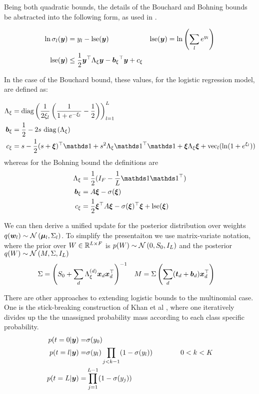 Being both quadratic bounds, the details of the Bouchard and Bohning bounds be abstracted into the following form, as used in \cite{Khan2010}.

\begin{align}
\ln \sigma_l(\bm y) & = y_l - \text{lse} (\bm y) & \text{lse} (\bm y) & = \ln \left(\sum_l e^{y_l} \right)\\
\text{lse}(\bm y) & \leq \frac{1}{2} \bm y^\top { \Lambda_{\xi} } \bm y - { \bm b_{\xi} }^\top\bm y + { c_{\xi} }
\end{align}

In the case of the Bouchard bound, these values, for the logistic regression model, are defined as:

\begin{align}
\Axi & = \diag{\frac{1}{2\xi_l} \left( \frac{1}{1 + e^{-\xi_l}} - \half\right) }_{l=1}^L  \\
\bxi & = \half - 2 s \text{ }\diag{\Axi} \\
\cxi & = s - \half (s + \vv{\xi})\T\one + s^2\Axi \one\T\one + \vv{\xi}\Axi\vv{\xi} + \text{vec}_l(\ln (1 + e^{\xi_l}))
\end{align}
whereas for the Bohning bound the definitions are
\begin{align}
\Axi & = \half (I_F - \frac{1}{L} \one \one \T) \\
\bxi & = A \vv{\xi} - \sigma(\vv{\xi})\\
\cxi & = \half \vv{\xi}\T A \vv{\xi} - \sigma(\vv{\xi})\T\vv{\xi} + \lse(\vv{\xi})
\end{align}

We can then derive a unified update for the posterior distribution over weights $q(\bm w_l) \sim \mathcal{N} \left( {\bm \mu_l}, {\Sigma_l} \right)$. To simplify the presentaiton we use matrix-variate notation, where the prior over $W \in { \mathbb{R}^{L \times F} }$ is $p(W) \sim \mathcal{N} \left(0, S_0, I_L\right)$ and the posterior $q(W) \sim \mathcal{N} \left(M, \Sigma, I_L\right)$
\begin{align}
\Sigma &= {\left( S_0 + \sum_d \Lambda_\xi^{(d)}\bm x_d\bm x_d^\top \right)}^{-1} & M &= \Sigma \left(\sum_d (\bm t_d + \bm b_d)\bm x_d^\top\right)
\end{align}


\newcommand \C { \mathcal{C} }

There are other approaches to extending logistic bounds to the multinomial case. One is the stick-breaking construction of Khan et al \cite{Khan2012stick}, where one iteratively divides up the the unassigned probability mass according to each class specific probability.
\begin{align}
\begin{split}
p(t = 0 | \bm y) = & \sigma(y_0) \\
p(t = l | \bm y) = & \sigma(y_l) \prod_{j < k - 1} (1 - \sigma(y_l)) \qquad\qquad 0 < k < K \\
p (t = L | \bm y) = & \prod_{j = 1}^{L - 1} (1 - \sigma(y_j))
\end{split}
\end{align}


